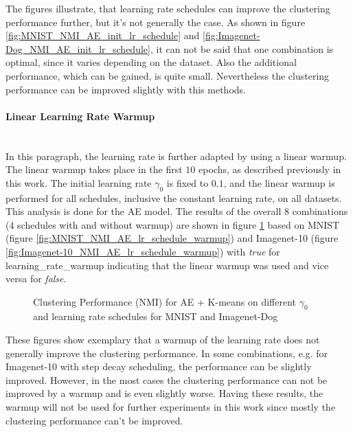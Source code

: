 \documentclass[12pt,DIV14,BCOR12mm,a4paper,footexclude,headinclude,halfparskip-,twoside,openright,cleardoubleempty,idxtotoc,bibtotoc,listtotoc,abstracton]{scrreprt} %
\numberwithin{equation}{chapter}
\begin{document}
The figures illustrate, that learning rate schedules can improve the clustering performance further, but it's not generally the case. As shown in figure \ref{fig:MNIST_NMI_AE_init_lr_schedule} and \ref{fig:Imagenet-Dog_NMI_AE_init_lr_schedule}, it can not be said that one combination is optimal, since it varies depending on the dataset. Also the additional performance, which can be gained, is quite small. Nevertheless the clustering performance can be improved slightly with this methods.
\paragraph{Linear Learning Rate Warmup}\hfill \\
In this paragraph, the learning rate is further adapted by using a linear warmup. The linear warmup takes place in the first $10$ epochs, as described previously in this work. The initial learning rate $\gamma_0$ is fixed to $0.1$, and the linear warmup is performed for all schedules, inclusive the constant learning rate, on all datasets. This analysis is done for the AE model. The results of the overall $8$ combinations ($4$ schedules with and without warmup) are shown in figure \ref{fig:ClusterPerformance_AE_lr_schedule_warmup} based on MNIST (figure \ref{fig:MNIST_NMI_AE_lr_schedule_warmup}) and Imagenet-10 (figure \ref{fig:Imagenet-10_NMI_AE_lr_schedule_warmup}) with \textit{true} for learning\_rate\_warmup indicating that the linear warmup was used and vice versa for \textit{false}.
	 \begin{figure}[htb!]
		\centering
		\qquad
		\caption{Clustering Performance (NMI) for AE + K-means on different $\gamma_0$ and learning rate schedules for MNIST and Imagenet-Dog}
		\label{fig:ClusterPerformance_AE_lr_schedule_warmup}
	\end{figure}
These figures show exemplary that a warmup of the learning rate does not generally improve the clustering performance. In some combinations, e.g. for Imagenet-10 with step decay scheduling, the performance can be slightly improved. However, in the most cases the clustering performance can not be improved by a warmup and is even slightly worse. Having these results, the warmup will not be used for further experiments in this work since mostly the clustering performance can't be improved. 
\end{document}
